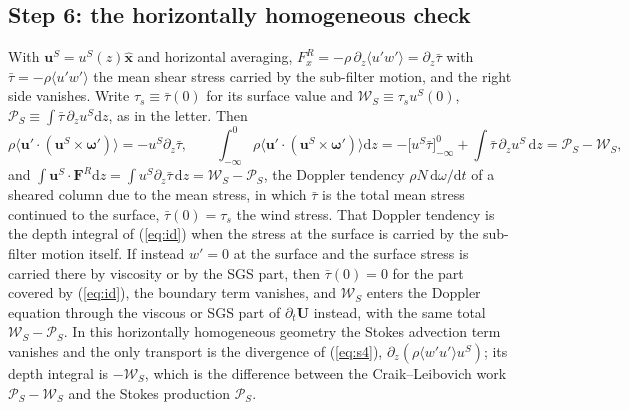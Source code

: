 \documentclass[10pt]{article}
\newcommand{\av}[1]{\langle #1\rangle}\newcommand{\uS}{\bm u^S}\newcommand{\WS}{\mathcal W_S}\newcommand{\PS}{\mathcal P_S}
\newcommand{\bu}{\bm u}\newcommand{\bU}{\bm U}\newcommand{\bxi}{\bm\xi}\newcommand{\dd}{\mathrm d}
\begin{document}
\subsection{Step 6: the horizontally homogeneous check}
With $\uS=u^S(z)\hat{\bm x}$ and horizontal averaging, $F^R_x=-\rho\,\partial_z\av{u'w'}=\partial_z\bar\tau$ with $\bar\tau=-\rho\av{u'w'}$ the mean shear stress carried by the sub-filter motion, and the right side vanishes. Write $\tau_s\equiv\bar\tau(0)$ for its surface value and $\WS\equiv\tau_su^S(0)$, $\PS\equiv\int\bar\tau\,\partial_zu^S\dd z$, as in the letter. Then
\[
\rho\av{\bu'\cdot(\uS\times\bm\omega')}=-u^S\partial_z\bar\tau,\qquad
\int_{-\infty}^0\rho\av{\bu'\cdot(\uS\times\bm\omega')}\dd z=-\big[u^S\bar\tau\big]_{-\infty}^{0}+\int\bar\tau\,\partial_zu^S\,\dd z=\PS-\WS,
\]
and $\int\uS\!\cdot\bm F^R\dd z=\int u^S\partial_z\bar\tau\,\dd z=\WS-\PS$, the Doppler tendency $\rho N\,\dd\omega/\dd t$ of a sheared column due to the mean stress, in which $\bar\tau$ is the total mean stress continued to the surface, $\bar\tau(0)=\tau_s$ the wind stress. That Doppler tendency is the depth integral of (\ref{eq:id}) when the stress at the surface is carried by the sub-filter motion itself. If instead $w'=0$ at the surface and the surface stress is carried there by viscosity or by the SGS part, then $\bar\tau(0)=0$ for the part covered by (\ref{eq:id}), the boundary term vanishes, and $\WS$ enters the Doppler equation through the viscous or SGS part of $\partial_t\bU$ instead, with the same total $\WS-\PS$. In this horizontally homogeneous geometry the Stokes advection term vanishes and the only transport is the divergence of (\ref{eq:s4}), $\partial_z(\rho\av{w'u'}u^S)$; its depth integral is $-\WS$, which is the difference between the Craik--Leibovich work $\PS-\WS$ and the Stokes production $\PS$.
\end{document}

